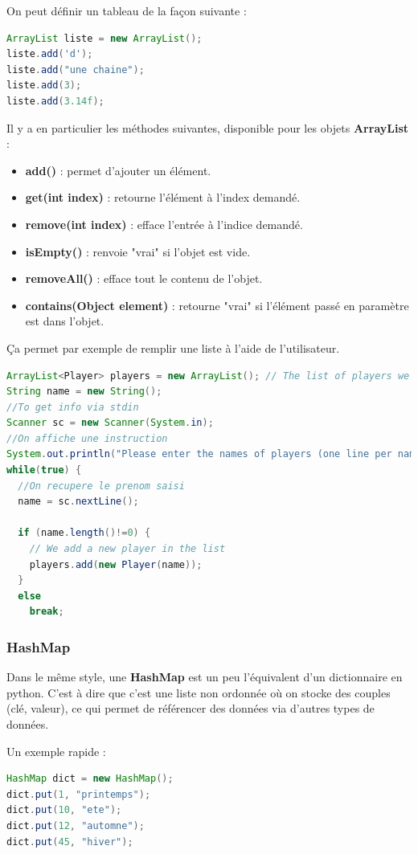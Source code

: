 \documentclass[a4paper,twoside]{article}
\begin{document}
On peut définir un tableau de la façon suivante :
\begin{lstlisting}[language=java]
ArrayList liste = new ArrayList();
liste.add('d');
liste.add("une chaine");
liste.add(3);
liste.add(3.14f);
\end{lstlisting}

Il y a en particulier les méthodes suivantes, disponible pour les objets \textbf{ArrayList} :
\begin{itemize}
\item \textbf{add()} : permet d'ajouter un élément.
\item \textbf{get(int index)} : retourne l'élément à l'index demandé.
\item \textbf{remove(int index)} : efface l'entrée à l'indice demandé.
\item \textbf{isEmpty()} : renvoie "vrai" si l'objet est vide.
\item \textbf{removeAll()} : efface tout le contenu de l'objet.
\item \textbf{contains(Object element)} : retourne "vrai" si l'élément passé en paramètre est dans l'objet.
\end{itemize}


Ça permet par exemple de remplir une liste à l'aide de l'utilisateur.
\begin{lstlisting}[language=java]
ArrayList<Player> players = new ArrayList(); // The list of players we want to define
String name = new String();
//To get info via stdin
Scanner sc = new Scanner(System.in);
//On affiche une instruction
System.out.println("Please enter the names of players (one line per name, leave a blank line to end the process) :");
while(true) {
  //On recupere le prenom saisi
  name = sc.nextLine();
  
  if (name.length()!=0) {
    // We add a new player in the list
    players.add(new Player(name));
  }
  else
    break;
\end{lstlisting}

\subsubsection{HashMap}
Dans le même style, une \textbf{HashMap} est un peu l'équivalent d'un dictionnaire en python. C'est à dire que c'est une liste non ordonnée où on stocke des couples (clé, valeur), ce qui permet de référencer des données via d'autres types de données. 

Un exemple rapide :
\begin{lstlisting}[language=java]
HashMap dict = new HashMap();
dict.put(1, "printemps");
dict.put(10, "ete");
dict.put(12, "automne");
dict.put(45, "hiver");
\end{lstlisting}
\end{document}
